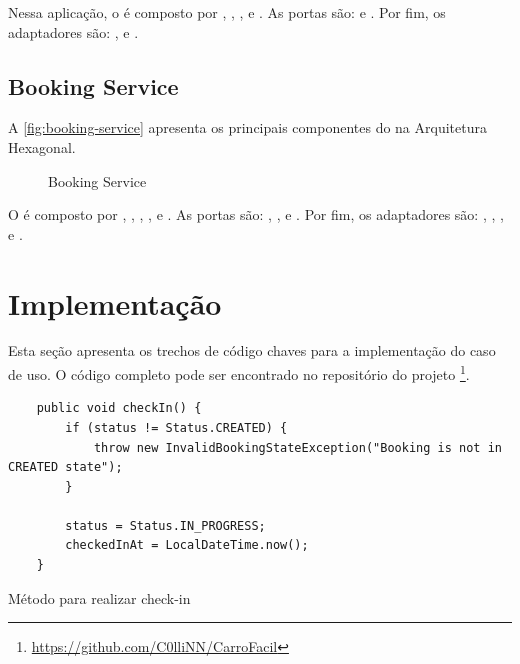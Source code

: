 Nessa aplicação, o  é composto por , , ,  e . As portas são:  e . Por fim, os adaptadores são: ,  e .

\subsection{Booking Service}
A \autoref{fig:booking-service} apresenta os principais componentes do  na Arquitetura Hexagonal.

\begin{figure}[H]
    \centering
    \caption{Booking Service}
    \label{fig:booking-service}
\end{figure}

O  é composto por , , , ,  e . As portas são: , ,  e . Por fim, os adaptadores são: , , ,  e .

\section{Implementação}
Esta seção apresenta os trechos de código chaves para a implementação do caso de uso. O código completo pode ser encontrado no repositório do projeto \footnote{\url{https://github.com/C0lliNN/CarroFacil}}.

\begin{codigo}[H]
\begin{lstlisting}
    public void checkIn() {
        if (status != Status.CREATED) {
            throw new InvalidBookingStateException("Booking is not in CREATED state");
        }

        status = Status.IN_PROGRESS;
        checkedInAt = LocalDateTime.now();
    }   
\end{lstlisting}
\caption{Método para realizar check-in}
\end{codigo}
